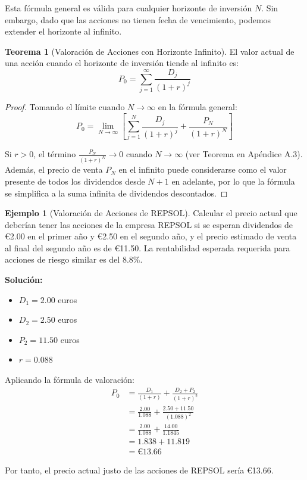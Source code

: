 \documentclass[12pt,a4paper]{article}
\theoremstyle{definition}
\newtheorem{teorema}{Teorema}[section]
\newtheorem{ejemplo}{Ejemplo}[section]
\begin{document}
Esta fórmula general es válida para cualquier horizonte de inversión $N$. Sin embargo, dado que las acciones no tienen fecha de vencimiento, podemos extender el horizonte al infinito.

\begin{teorema}[Valoración de Acciones con Horizonte Infinito]
El valor actual de una acción cuando el horizonte de inversión tiende al infinito es:
\begin{equation}
P_0 = \sum_{j=1}^{\infty} \frac{D_j}{(1+r)^j}
\end{equation}
\end{teorema}

\begin{proof}
Tomando el límite cuando $N \to \infty$ en la fórmula general:
$$P_0 = \lim_{N \to \infty} \left[\sum_{j=1}^{N} \frac{D_j}{(1+r)^j} + \frac{P_N}{(1+r)^N}\right]$$

Si $r > 0$, el término $\frac{P_N}{(1+r)^N} \to 0$ cuando $N \to \infty$ (ver Teorema en Apéndice A.3). Además, el precio de venta $P_N$ en el infinito puede considerarse como el valor presente de todos los dividendos desde $N+1$ en adelante, por lo que la fórmula se simplifica a la suma infinita de dividendos descontados.
\end{proof}

\begin{ejemplo}[Valoración de Acciones de REPSOL]
Calcular el precio actual que deberían tener las acciones de la empresa REPSOL si se esperan dividendos de €2.00 en el primer año y €2.50 en el segundo año, y el precio estimado de venta al final del segundo año es de €11.50. La rentabilidad esperada requerida para acciones de riesgo similar es del 8.8\%.

\textbf{Solución:}
\begin{itemize}
\item $D_1 = 2.00$ euros
\item $D_2 = 2.50$ euros
\item $P_2 = 11.50$ euros
\item $r = 0.088$
\end{itemize}

Aplicando la fórmula de valoración:
\begin{align*}
P_0 &= \frac{D_1}{(1+r)} + \frac{D_2 + P_2}{(1+r)^2} \\
&= \frac{2.00}{1.088} + \frac{2.50 + 11.50}{(1.088)^2} \\
&= \frac{2.00}{1.088} + \frac{14.00}{1.1845} \\
&= 1.838 + 11.819 \\
&= \text{€}13.66
\end{align*}

Por tanto, el precio actual justo de las acciones de REPSOL sería €13.66.
\end{ejemplo}
\end{document}
